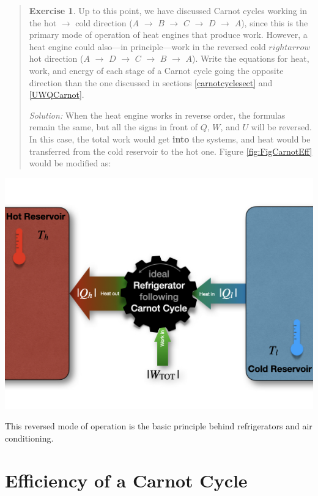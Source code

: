 \documentclass[
  9pt,
]{extbook}
\theoremstyle{definition}
\theoremstyle{definition}
\theoremstyle{definition}
\newtheorem{exercise}{Exercise}[chapter]
\theoremstyle{remark}
\begin{document}
\begin{quote}
\begin{exercise}
\protect\hypertarget{exr:CarnotEx}{}{\label{exr:CarnotEx} }Up to this point, we have discussed Carnot cycles working in the hot \(\rightarrow\) cold direction (\(A\) \(\rightarrow\) \(B\) \(\rightarrow\) \(C\) \(\rightarrow\) \(D\) \(\rightarrow\) \(A\)), since this is the primary mode of operation of heat engines that produce work. However, a heat engine could also---in principle---work in the reversed cold \(rightarrow\) hot direction (\(A\) \(\rightarrow\) \(D\) \(\rightarrow\) \(C\) \(\rightarrow\) \(B\) \(\rightarrow\) \(A\)). Write the equations for heat, work, and energy of each stage of a Carnot cycle going the opposite direction than the one discussed in sections \ref{carnotcyclesect} and \ref{UWQCarnot}.

\emph{Solution:} When the heat engine works in reverse order, the formulas remain the same, but all the signs in front of \(Q\), \(W\), and \(U\) will be reversed. In this case, the total work would get \textbf{into} the systems, and heat would be transferred from the cold reservoir to the hot one. Figure \ref{fig:FigCarnotEff} would be modified as:
\end{exercise}
\end{quote}

\begin{flushright}\includegraphics[width=0.6\linewidth]{./img/OEP_Figures.010} \end{flushright}

This reversed mode of operation is the basic principle behind refrigerators and air conditioning.

\hypertarget{efficiency-of-a-carnot-cycle}{%
\section{Efficiency of a Carnot Cycle}\label{efficiency-of-a-carnot-cycle}}
\end{document}

